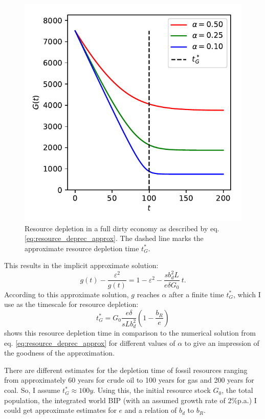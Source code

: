 \begin{figure}
    \vspace{-.8 cm}
    \hspace{-1.5cm}\includegraphics[width = .58 \textwidth]{figures/g_depletion.pdf}
    \caption[Resource depletion in a full dirty economy]{Resource depletion in a full dirty economy as described by eq. \eqref{eq:resource_deprec_approx}. The dashed line marks the approximate resource depletion time $t^*_G$. \label{fig:g_depletion}}
\end{figure}

This results in the implicit approximate solution:
\begin{equation}
  g(t) - \frac{\varepsilon^2}{g(t)} = 1 -\varepsilon^2 - \frac{s b_d^2 L}{e \delta G_0} \ t.
	\label{eq:resource_transient_solution2}
\end{equation}
According to this approximate solution, $g$ reaches $\alpha$ after a finite time $t^*_G$, which I use as the timescale for resource depletion:
\begin{equation}
	t^*_G = G_0\frac{e \delta}{s L b_d^2}\left( 1-\frac{b_R}{e} \right)
	\label{eq:resource_depletion_time}
\end{equation}
 shows this resource depletion time in comparison to the numerical solution from eq. \ref{eq:resource_deprec_approx} for different values of $\alpha$ to give an impression of the goodness of the approximation.

There are different estimates for the depletion time of fossil resources ranging from approximately 60 years for crude oil to 100 years for gas and 200 years for coal.
So, I assume $t^*_G \approx 100y$. Using this, the initial resource stock $G_0$, the total population, the integrated world BIP (with an assumed growth rate of 2\%p.a.) I could get approximate estimates for $e$ and a relation of $b_d$ to  $b_R$.

